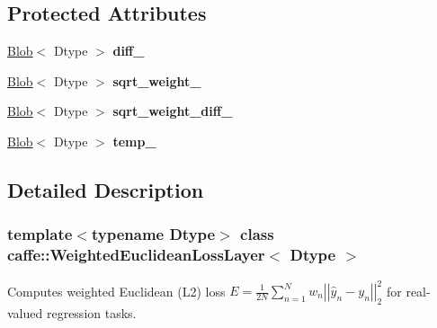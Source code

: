 \subsection*{Protected Attributes}
\begin{DoxyCompactItemize}
\item 
\mbox{\label{classcaffe_1_1_weighted_euclidean_loss_layer_a8e722d18dc86b1bc0dfc5cda2e6ead67}} 
\mbox{\hyperlink{classcaffe_1_1_blob}{Blob}}$<$ Dtype $>$ {\bfseries diff\+\_\+}
\item 
\mbox{\label{classcaffe_1_1_weighted_euclidean_loss_layer_ae464fcf329795c905bba72da35a6826f}} 
\mbox{\hyperlink{classcaffe_1_1_blob}{Blob}}$<$ Dtype $>$ {\bfseries sqrt\+\_\+weight\+\_\+}
\item 
\mbox{\label{classcaffe_1_1_weighted_euclidean_loss_layer_a93f21c599a2d4b11160f1deb6b506a09}} 
\mbox{\hyperlink{classcaffe_1_1_blob}{Blob}}$<$ Dtype $>$ {\bfseries sqrt\+\_\+weight\+\_\+diff\+\_\+}
\item 
\mbox{\label{classcaffe_1_1_weighted_euclidean_loss_layer_a461ec3882fbd6adb2f6feeb465f34b10}} 
\mbox{\hyperlink{classcaffe_1_1_blob}{Blob}}$<$ Dtype $>$ {\bfseries temp\+\_\+}
\end{DoxyCompactItemize}


\subsection{Detailed Description}
\subsubsection*{template$<$typename Dtype$>$\newline
class caffe\+::\+Weighted\+Euclidean\+Loss\+Layer$<$ Dtype $>$}

Computes weighted Euclidean (L2) loss $ E = \frac{1}{2N} \sum\limits_{n=1}^N w_n \left| \left| \hat{y}_n - y_n \right| \right|_2^2 $ for real-\/valued regression tasks. 


